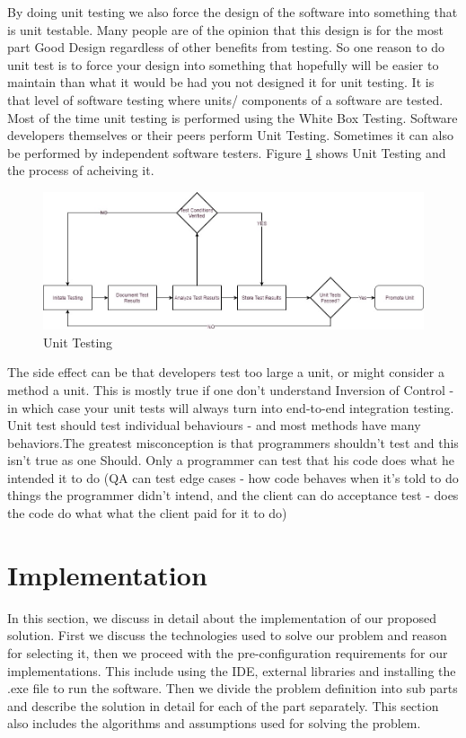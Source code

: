 \documentclass[article,type=msc,colorback,accentcolor=tud9c,twoside,11pt]{tudthesis}
\begin{document}
 By doing unit testing we also force the design of the software into something that is unit testable. Many people are of the opinion that this design is for the most part Good Design regardless of other benefits from testing. So one reason to do unit test is to force your design into something that hopefully will be easier to maintain than what it would be had you not designed it for unit testing. It is that level of software testing where units/ components of a software are tested. Most of the time unit testing is performed using the White Box Testing. Software developers themselves or their peers perform Unit Testing. Sometimes it can also be performed by independent software testers. Figure \ref{fig:UnitTesting} shows Unit Testing and the process of acheiving it.
\begin{figure}[h]
	\centering
	\includegraphics[scale=0.5]{UnitTesting.jpg}
	\caption{Unit Testing}
	\label{fig:UnitTesting}
\end{figure}

The side effect can be that developers test too large a unit, or might consider a method a unit. This is mostly true if one don't understand Inversion of Control - in which case your unit tests will always turn into end-to-end integration testing. Unit test should test individual behaviours - and most methods have many behaviors.The greatest misconception is that programmers shouldn't test and this isn't true as one Should. Only a programmer can test that his code does what he intended it to do (QA can test edge cases - how code behaves when it's told to do things the programmer didn't intend, and the client can do acceptance test - does the code do what what the client paid for it to do)
\clearpage
\section{Implementation}
In this section, we discuss in detail about the implementation of our proposed solution. First we discuss the technologies used to solve our problem and reason for selecting it, then we proceed with the pre-configuration requirements for our implementations. This include using the IDE, external libraries and installing the .exe file to run the software. Then we divide the problem definition into sub parts and describe the solution in detail for each of the part separately. This section also includes the algorithms and assumptions used for solving the problem.
\end{document}
